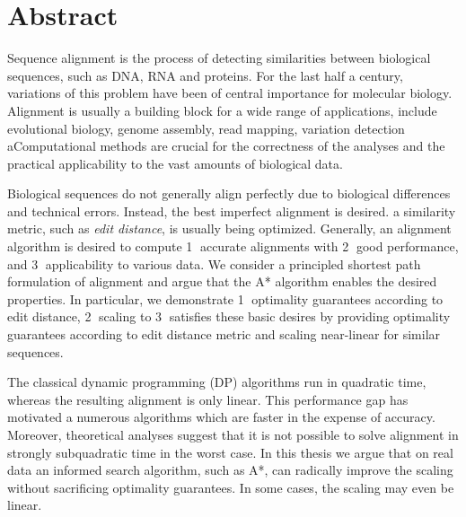 \begingroup
\let\clearpage\relax
\let\cleardoublepage\relax
\let\cleardoublepage\relax

\chapter*{Abstract}

Sequence alignment is the process of detecting similarities between biological
sequences, such as DNA, RNA and proteins. For the last half a century,
variations of this problem have been of central importance for molecular
biology. Alignment is usually a building block for a wide range of applications,
include evolutional biology, genome assembly, read mapping, variation detection
aComputational methods are crucial for the correctness of the analyses and the
practical applicability to the vast amounts of biological data.

Biological sequences do not generally align perfectly due to biological
differences and technical errors. Instead, the best imperfect alignment is
desired. a similarity metric, such as \emph{edit distance}, is usually being
optimized. Generally, an alignment algorithm is desired to compute
\textcircled{1} accurate alignments with \textcircled{2} good performance, and
\textcircled{3} applicability to various data. We consider a principled shortest
path formulation of alignment and argue that the A* algorithm enables the
desired properties. In particular, we demonstrate \textcircled{1} optimality
guarantees according to edit distance, \textcircled{2} scaling to
\textcircled{3} satisfies these basic desires by providing optimality guarantees
according to edit distance metric and scaling near-linear for similar sequences.


The classical dynamic programming (DP) algorithms run in quadratic time, whereas
the resulting alignment is only linear. This performance gap has motivated a
numerous algorithms which are faster in the expense of accuracy. Moreover,
theoretical analyses suggest that it is not possible to solve alignment in
strongly subquadratic time in the worst case. In this thesis we argue that on
real data an informed search algorithm, such as A*, can radically improve the scaling
without sacrificing optimality guarantees. In some cases, the scaling may even
be linear.

